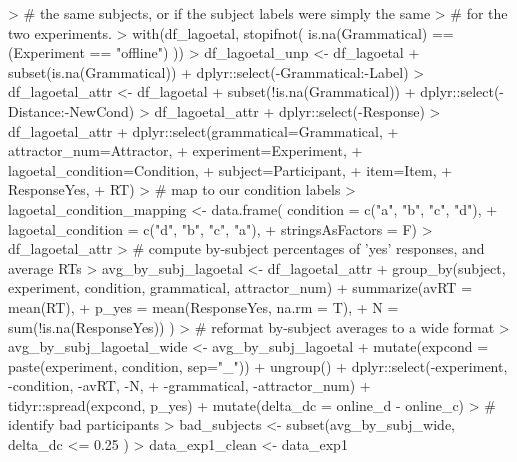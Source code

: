\documentclass[doc,a4paper,man,natbib,floatsintext,noextraspace]{apa6}
\begin{document}
\begin{Schunk}
\begin{Sinput}
> #       the same subjects, or if the subject labels were simply the same
> #       for the two experiments.
> with(df_lagoetal, stopifnot( is.na(Grammatical) == (Experiment == "offline") ))
> df_lagoetal_unp <- df_lagoetal %>% 
+                     subset(is.na(Grammatical)) %>%
+                     dplyr::select(-Grammatical:-Label)
> df_lagoetal_attr <- df_lagoetal %>% 
+                   subset(!is.na(Grammatical)) %>%
+                   dplyr::select(-Distance:-NewCond)
> df_lagoetal_attr %<>% mutate(ResponseYes = (Response == "yes") ) %>% 
+                       dplyr::select(-Response)
> df_lagoetal_attr %<>% ungroup() %>%
+                       dplyr::select(grammatical=Grammatical,
+                                     attractor_num=Attractor,
+                                     experiment=Experiment,
+                                     lagoetal_condition=Condition, 
+                                     subject=Participant, 
+                                     item=Item,
+                                     ResponseYes,
+                                     RT)
> # map to our condition labels
> lagoetal_condition_mapping <- data.frame( condition = c("a", "b", "c", "d"),
+                                           lagoetal_condition = c("d", "b", "c", "a"), 
+                                           stringsAsFactors = F)
> df_lagoetal_attr %<>% left_join( lagoetal_condition_mapping, by = "lagoetal_condition" )
> # compute by-subject percentages of 'yes' responses, and average RTs 
> avg_by_subj_lagoetal <- df_lagoetal_attr %>%
+                             group_by(subject, experiment, condition, grammatical, attractor_num) %>%
+                             summarize(avRT = mean(RT), 
+                                       p_yes = mean(ResponseYes, na.rm = T), 
+                                       N = sum(!is.na(ResponseYes))  )
> # reformat by-subject averages to a wide format
> avg_by_subj_lagoetal_wide <- avg_by_subj_lagoetal %>% 
+                                     mutate(expcond = paste(experiment, condition, sep="_")) %>% 
+                                     ungroup() %>%
+                                     dplyr::select(-experiment, -condition, -avRT, -N,
+                                                   -grammatical, -attractor_num) %>%
+                                     tidyr::spread(expcond, p_yes) %>% 
+                                     mutate(delta_dc = online_d - online_c)
> # identify bad participants 
> bad_subjects <- subset(avg_by_subj_wide, delta_dc <= 0.25 ) %>% .$subject
> data_exp1_clean <- data_exp1 %>% subset(!subject %in% bad_subjects)

\end{Sinput}
\end{Schunk}
\end{document}
